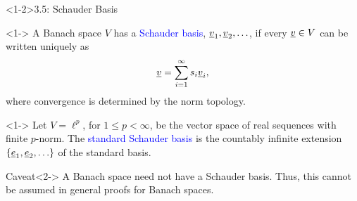 \documentclass[10pt,english,aspectratio=169]{beamer}
\begin{document}
\begin{frame}<1-2>{3.5: Schauder Basis}

\begin{definition}<1->
A Banach space $V$ has a \textcolor{blue}{Schauder basis}, $\underline{v}_1, \underline{v}_2, \ldots$, if every $\underline{v} \in V$ can be written uniquely as
\[ \underline{v} = \sum_{i=1}^\infty s_i \underline{v}_i, \]
where convergence is determined by the norm topology.
\end{definition}

\begin{example}<1->
Let $V = \ell^p$, for $1 \leq p < \infty$, be the vector space of real sequences with finite $p$-norm.
The \textcolor{blue}{standard Schauder basis} is the countably infinite extension $\{\underline{e}_1 ,\underline{e}_2, \ldots \}$ of the standard basis.
\end{example}

\begin{block}{Caveat}<2->
A Banach space need not have a Schauder basis.
Thus, this cannot be assumed in general proofs for Banach spaces.
\end{block}


\end{frame}
\end{document}
